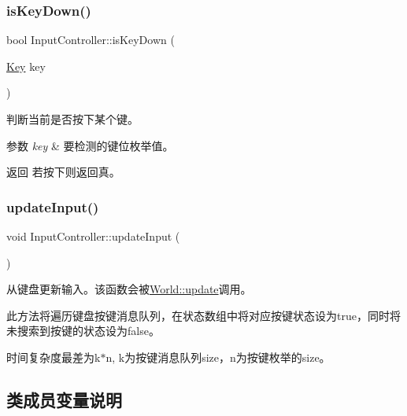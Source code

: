 \subsubsection{\texorpdfstring{is\+Key\+Down()}{isKeyDown()}}
{\footnotesize\ttfamily bool Input\+Controller\+::is\+Key\+Down (\begin{DoxyParamCaption}\item[{\hyperlink{class_input_controller_a840a7425e2220e1ef5659a7ea4ba122d}{Key}}]{key }\end{DoxyParamCaption})}



判断当前是否按下某个键。 


\begin{DoxyParams}{参数}
{\em key} & 要检测的键位枚举值。 \\
\hline
\end{DoxyParams}
\begin{DoxyReturn}{返回}
若按下则返回真。 
\end{DoxyReturn}
\mbox{\label{class_input_controller_a2a88542ae1370cf3f5ace3c4bb8813d9}} 
\subsubsection{\texorpdfstring{update\+Input()}{updateInput()}}
{\footnotesize\ttfamily void Input\+Controller\+::update\+Input (\begin{DoxyParamCaption}{ }\end{DoxyParamCaption})}



从键盘更新输入。该函数会被\hyperlink{class_world_aac8c1fde63c06577ffc648aaefdb37f0}{World\+::update}调用。 

此方法将遍历键盘按键消息队列，在状态数组中将对应按键状态设为true，同时将未搜索到按键的状态设为false。

时间复杂度最差为k$\ast$n, k为按键消息队列size，n为按键枚举的size。 

\subsection{类成员变量说明}
\mbox{\label{class_input_controller_afa9908a71b2107375b9104e51b465b06}} 
